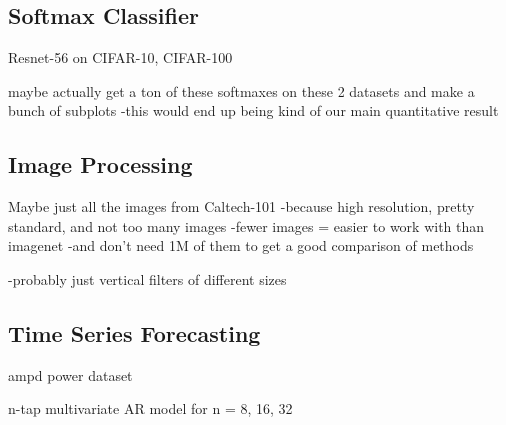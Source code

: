 
\subsection{Softmax Classifier}

Resnet-56 on CIFAR-10, CIFAR-100

maybe actually get a ton of these softmaxes on these 2 datasets and make a bunch of subplots
    -this would end up being kind of our main quantitative result

\subsection{Image Processing}

Maybe just all the images from Caltech-101
    -because high resolution, pretty standard, and not too many images
        -fewer images = easier to work with than imagenet
            -and don't need 1M of them to get a good comparison of methods

    -probably just vertical filters of different sizes


\subsection{Time Series Forecasting}

ampd power dataset

n-tap multivariate AR model for n = 8, 16, 32


